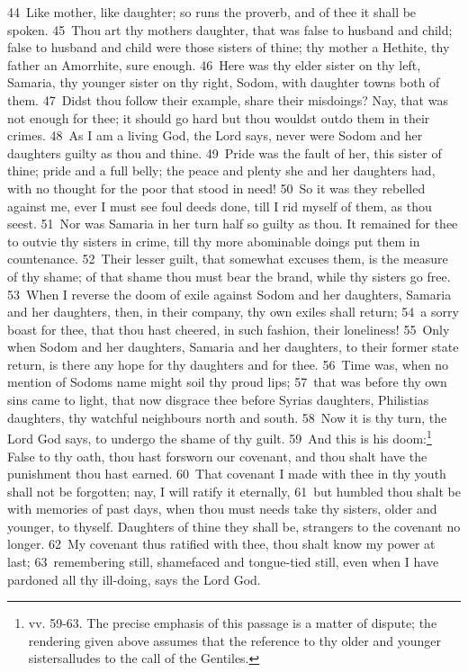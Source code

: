 \documentclass[10pt]{book} %
\begin{document}
\textcolor{benred8}{44}~Like mother, like daughter; so runs the proverb, and of thee it shall be spoken. \textcolor{benred8}{45}~Thou art thy mother\textquotesingle s daughter, that was false to husband and child; false to husband and child were those sisters of thine; thy mother a Hethite, thy father an Amorrhite, sure enough. \textcolor{benred8}{46}~Here was thy elder sister on thy left, Samaria, thy younger sister on thy right, Sodom, with daughter towns both of them. \textcolor{benred8}{47}~Didst thou follow their example, share their misdoings? Nay, that was not enough for thee; it should go hard but thou wouldst outdo them in their crimes. \textcolor{benred8}{48}~As I am a living God, the Lord says, never were Sodom and her daughters guilty as thou and thine. \textcolor{benred8}{49}~Pride was the fault of her, this sister of thine; pride and a full belly; the peace and plenty she and her daughters had, with no thought for the poor that stood in need! \textcolor{benred8}{50}~So it was they rebelled against me, ever I must see foul deeds done, till I rid myself of them, as thou seest. \textcolor{benred8}{51}~Nor was Samaria in her turn half so guilty as thou. It remained for thee to outvie thy sisters in crime, till thy more abominable doings put them in countenance. \textcolor{benred8}{52}~Their lesser guilt, that somewhat excuses them, is the measure of thy shame; of that shame thou must bear the brand, while thy sisters go free. \textcolor{benred8}{53}~When I reverse the doom of exile against Sodom and her daughters, Samaria and her daughters, then, in their company, thy own exiles shall return; \textcolor{benred8}{54}~a sorry boast for thee, that thou hast cheered, in such fashion, their loneliness! \textcolor{benred8}{55}~Only when Sodom and her daughters, Samaria and her daughters, to their former state return, is there any hope for thy daughters and for thee.
\textcolor{benred8}{56}~Time was, when no mention of Sodom\textquotesingle s name might soil thy proud lips; \textcolor{benred8}{57}~that was before thy own sins came to light, that now disgrace thee before Syria\textquotesingle s daughters, Philistia\textquotesingle s daughters, thy watchful neighbours north and south. \textcolor{benred8}{58}~Now it is thy turn, the Lord God says, to undergo the shame of thy guilt. \textcolor{benred8}{59}~And this is his doom:\footnote[4]{vv. 59-63. The precise emphasis of this passage is a matter of dispute; the rendering given above assumes that the reference to \textasciigrave thy older and younger sisters\textquotesingle  alludes to the call of the Gentiles.} False to thy oath, thou hast forsworn our covenant, and thou shalt have the punishment thou hast earned. \textcolor{benred8}{60}~That covenant I made with thee in thy youth shall not be forgotten; nay, I will ratify it eternally, \textcolor{benred8}{61}~but humbled thou shalt be with memories of past days, when thou must needs take thy sisters, older and younger, to thyself. Daughters of thine they shall be, strangers to the covenant no longer. \textcolor{benred8}{62}~My covenant thus ratified with thee, thou shalt know my power at last; \textcolor{benred8}{63}~remembering still, shamefaced and tongue-tied still, even when I have pardoned all thy ill-doing, says the Lord God.
\end{document}
